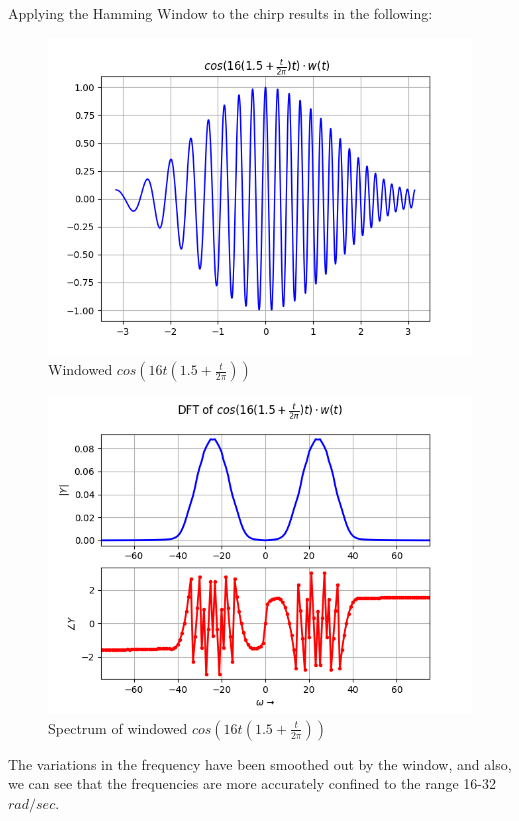 \documentclass[11pt, a4paper, twoside]{article}
\begin{document}
    Applying the Hamming Window to the chirp results in the following:
    \begin{figure}[H]
        \centering
        \includegraphics[scale=0.45]{Fig8.png}
        \caption{Windowed $cos(16t(1.5 + \frac{t}{2\pi}))$}
        \label{fig:Fig6}
    \end{figure}
    \begin{figure}[H]
        \centering
        \includegraphics[scale=0.5]{Fig9.png}
        \caption{Spectrum of windowed $cos(16t(1.5 + \frac{t}{2\pi}))$}
        \label{fig:Fig6}
    \end{figure}
    
    The variations in the frequency have been smoothed out by the window, and also, we can see that the frequencies are more accurately confined to the range 16-32 $rad/sec$.
\end{document}
